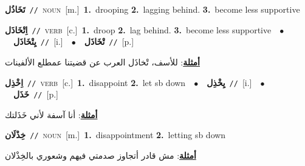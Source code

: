 \documentclass[10pt,a4paper,twoside]{article} %
\begin{document}
\begin{multicols}{2}
{{{{{{{{{{\setlength\topsep{0pt}\textbf{\foreignlanguage{arabic}{تَخَاذُل}}\ {\color{gray}\texttt{//}\color{black}}\ \textsc{noun}\ [m.]\ \textbf{1.}~drooping  \textbf{2.}~lagging behind.  \textbf{3.}~become less supportive\ 

{\setlength\topsep{0pt}\textbf{\foreignlanguage{arabic}{اِتْخَاذَل}}\ {\color{gray}\texttt{//}\color{black}}\ \textsc{verb}\ [c.]\ \textbf{1.}~droop  \textbf{2.}~lag behind.  \textbf{3.}~become less supportive\ \ $\bullet$\ \ \setlength\topsep{0pt}\textbf{\foreignlanguage{arabic}{يِتْخَاذَل}}\ {\color{gray}\texttt{//}\color{black}}\ [i.]\ \ $\bullet$\ \ \setlength\topsep{0pt}\textbf{\foreignlanguage{arabic}{تْخَاذَل}}\ {\color{gray}\texttt{//}\color{black}}\ [p.]\  \begin{flushright}\color{gray}\foreignlanguage{arabic}{\textbf{\underline{\foreignlanguage{arabic}{أمثلة}}}: للأسف، تْخاذَل العرب عن قضيتنا عمطلع الألفينات}\end{flushright}\color{black}} \vspace{2mm}

{\setlength\topsep{0pt}\textbf{\foreignlanguage{arabic}{اِخْذِل}}\ {\color{gray}\texttt{//}\color{black}}\ \textsc{verb}\ [c.]\ \textbf{1.}~disappoint  \textbf{2.}~let sb down\ \ $\bullet$\ \ \setlength\topsep{0pt}\textbf{\foreignlanguage{arabic}{يِخْذِل}}\ {\color{gray}\texttt{//}\color{black}}\ [i.]\ \ $\bullet$\ \ \setlength\topsep{0pt}\textbf{\foreignlanguage{arabic}{خَذَل}}\ {\color{gray}\texttt{//}\color{black}}\ [p.]\  \begin{flushright}\color{gray}\foreignlanguage{arabic}{\textbf{\underline{\foreignlanguage{arabic}{أمثلة}}}: أنا آسفة لأني خَذَلتك}\end{flushright}\color{black}} \vspace{2mm}

{\setlength\topsep{0pt}\textbf{\foreignlanguage{arabic}{خِذْلَان}}\ {\color{gray}\texttt{//}\color{black}}\ \textsc{noun}\ [m.]\ \textbf{1.}~disappointment  \textbf{2.}~letting sb down\  \begin{flushright}\color{gray}\foreignlanguage{arabic}{\textbf{\underline{\foreignlanguage{arabic}{أمثلة}}}: مش قادر أتجاوز صدمتي فيهم وشعوري بالخِذْلان}\end{flushright}\color{black}} \vspace{2mm}

}}}}}}}}}}
\end{multicols}
\end{document}
